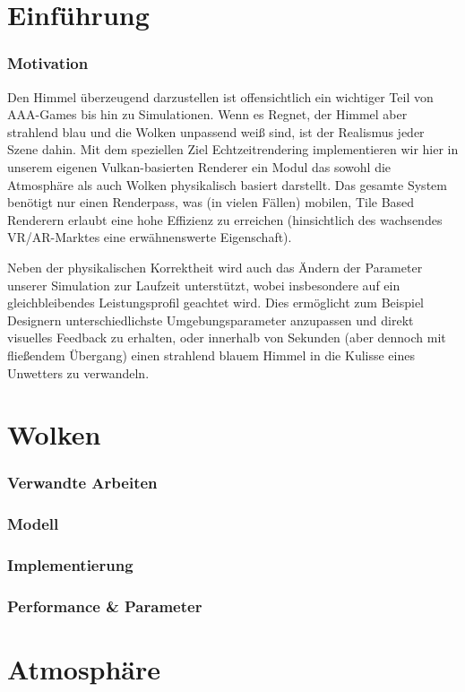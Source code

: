 \part{Einführung}
\section{Motivation}
Den Himmel überzeugend darzustellen ist offensichtlich ein wichtiger Teil von AAA-Games bis hin zu Simulationen. Wenn es
Regnet, der Himmel aber strahlend blau und die Wolken unpassend weiß sind, ist der Realismus jeder Szene dahin. Mit dem
speziellen Ziel Echtzeitrendering implementieren wir hier in unserem eigenen Vulkan-basierten Renderer ein Modul das
sowohl die Atmosphäre als auch Wolken physikalisch basiert darstellt. Das gesamte System benötigt nur einen Renderpass,
was (in vielen Fällen) mobilen, Tile Based Renderern erlaubt eine hohe Effizienz zu erreichen (hinsichtlich des
wachsendes VR/AR-Marktes eine erwähnenswerte Eigenschaft).

Neben der physikalischen Korrektheit wird auch das Ändern der Parameter unserer Simulation zur Laufzeit unterstützt,
wobei insbesondere auf ein gleichbleibendes Leistungsprofil geachtet wird. Dies ermöglicht zum Beispiel Designern
unterschiedlichste Umgebungsparameter anzupassen und direkt visuelles Feedback zu erhalten, oder innerhalb von Sekunden
(aber dennoch mit fließendem Übergang) einen strahlend blauem Himmel in die Kulisse eines Unwetters zu verwandeln.

\clearpage
\part{Wolken}
\section{Verwandte Arbeiten}
\section{Modell}
\section{Implementierung}
\section{Performance \& Parameter}

\clearpage
\part{Atmosphäre}

